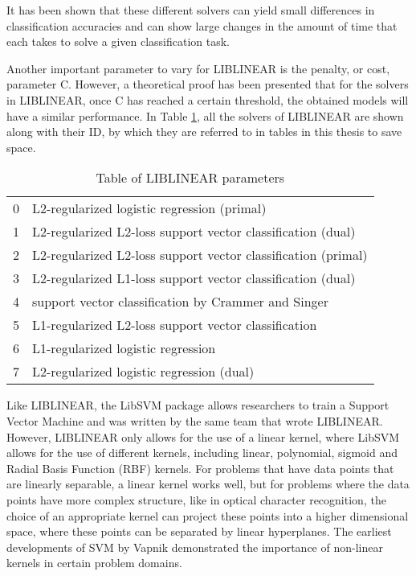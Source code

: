 It has been shown \cite{rongen2008liblinear} that these different solvers
can yield small differences in classification accuracies and can show
large changes in the amount of time that each takes to solve a given
classification task.

Another important parameter to vary for LIBLINEAR is the penalty, or
cost, parameter C.  However, a theoretical proof has been presented
\cite{keerthi2003asymptotic} that for the solvers in LIBLINEAR, once C
has reached a certain threshold, the obtained models will have a
similar performance.  In Table \ref{table:liblinearSolvers}, all the
solvers of LIBLINEAR are shown along with their ID, by which they are
referred to in tables in this thesis to save space.

\begin{table}
\begin{tabular}{|l|l|}
\hline
0 & L2-regularized logistic regression (primal) \\
1 & L2-regularized L2-loss support vector classification (dual) \\
2 & L2-regularized L2-loss support vector classification (primal) \\
3 & L2-regularized L1-loss support vector classification (dual) \\
4 & support vector classification by Crammer and Singer \\
5 & L1-regularized L2-loss support vector classification \\
6 & L1-regularized logistic regression \\
7 & L2-regularized logistic regression (dual) \\
\hline
\end{tabular}
\caption{Table of LIBLINEAR parameters}
\label{table:liblinearSolvers}
\end{table}

Like LIBLINEAR, the LibSVM \cite{chang2001libsvm} package allows
researchers to train a Support Vector Machine and was written by the
same team that wrote LIBLINEAR.  However, LIBLINEAR only allows for
the use of a linear kernel, where LibSVM allows for the use of
different kernels, including linear, polynomial, sigmoid and Radial
Basis Function (RBF) kernels.  For problems that have data points that
are linearly separable, a linear kernel works well, but for problems
where the data points have more complex structure, like in optical
character recognition, the choice of an appropriate kernel can project
these points into a higher dimensional space, where these points can
be separated by linear hyperplanes.  The earliest developments of SVM
by Vapnik \cite{cortes1995svm} demonstrated the importance of
non-linear kernels in certain problem domains.

